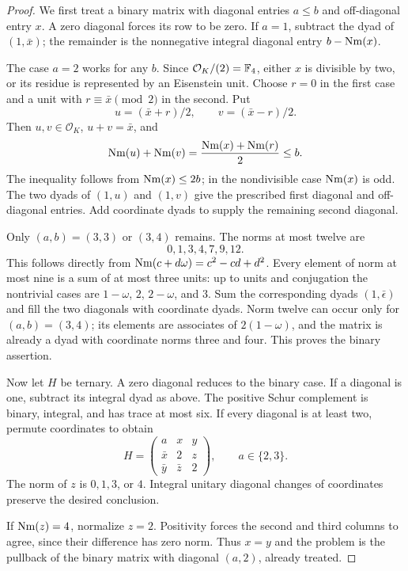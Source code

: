 \begin{proof}
We first treat a binary matrix with diagonal entries $a\leq b$ and off-diagonal entry $x$. A zero diagonal forces its row to be zero. If $a=1$, subtract the dyad of $(1,\bar x)$; the remainder is the nonnegative integral diagonal entry $b-\operatorname{Nm}(x)$.

The case $a=2$ works for any $b$. Since $\mathcal O_K/(2)=\mathbb F_4$, either $x$ is divisible by two, or its residue is represented by an Eisenstein unit. Choose $r=0$ in the first case and a unit with $r\equiv\bar x\pmod2$ in the second. Put
\[
u=(\bar x+r)/2,\qquad v=(\bar x-r)/2.
\]
Then $u,v\in\mathcal O_K$, $u+v=\bar x$, and
\[
\operatorname{Nm}(u)+\operatorname{Nm}(v)=\frac{\operatorname{Nm}(x)+\operatorname{Nm}(r)}2\leq b.
\]
The inequality follows from $\operatorname{Nm}(x)\leq2b$; in the nondivisible case $\operatorname{Nm}(x)$ is odd. The two dyads of $(1,u)$ and $(1,v)$ give the prescribed first diagonal and off-diagonal entries. Add coordinate dyads to supply the remaining second diagonal.

Only $(a,b)=(3,3)$ or $(3,4)$ remains. The norms at most twelve are
\[
0,1,3,4,7,9,12.
\]
This follows directly from $\operatorname{Nm}(c+d\omega)=c^2-cd+d^2$. Every element of norm at most nine is a sum of at most three units: up to units and conjugation the nontrivial cases are $1-\omega$, $2$, $2-\omega$, and $3$. Sum the corresponding dyads $(1,\bar\epsilon)$ and fill the two diagonals with coordinate dyads. Norm twelve can occur only for $(a,b)=(3,4)$; its elements are associates of $2(1-\omega)$, and the matrix is already a dyad with coordinate norms three and four. This proves the binary assertion.

Now let $H$ be ternary. A zero diagonal reduces to the binary case. If a diagonal is one, subtract its integral dyad as above. The positive Schur complement is binary, integral, and has trace at most six. If every diagonal is at least two, permute coordinates to obtain
\[
H=\begin{pmatrix}
a&x&y\\ \bar x&2&z\\ \bar y&\bar z&2
\end{pmatrix},\qquad a\in\{2,3\}.
\]
The norm of $z$ is $0,1,3$, or $4$. Integral unitary diagonal changes of coordinates preserve the desired conclusion.

If $\operatorname{Nm}(z)=4$, normalize $z=2$. Positivity forces the second and third columns to agree, since their difference has zero norm. Thus $x=y$ and the problem is the pullback of the binary matrix with diagonal $(a,2)$, already treated.


\end{proof}
